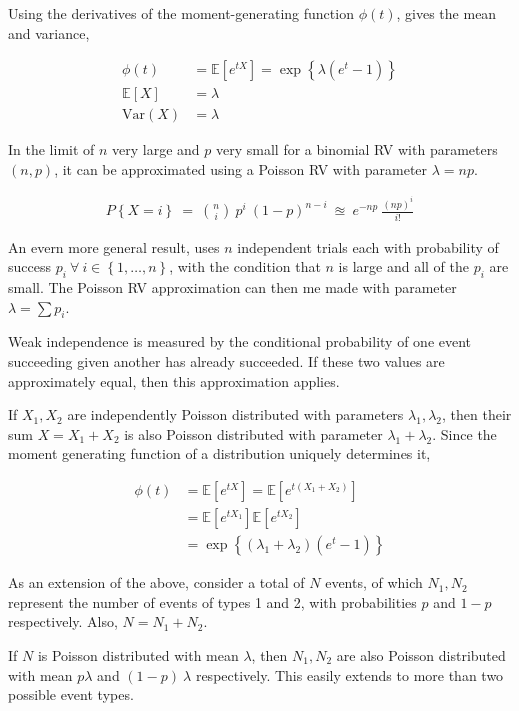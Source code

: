 Using the derivatives of the moment-generating function $ \phi(t) $, gives the mean and variance,

\begin{align}
	\phi(t) &= \mathbb{E}[e^{tX}] = \exp\left\{\lambda (e^t - 1)\right\}\\
	\mathbb{E}[X] &= \lambda \\
	\mathrm{Var}(X) &= \lambda
\end{align}

In the limit of $ n $ very large and $ p $ very small for a binomial RV with parameters $ (n, p) $, it can be approximated using a Poisson RV with parameter $ \lambda = np $.

\begin{align}
	P \left\{X = i\right\}\ =\ \binom{n}{i}\ p^i\ (1-p)^{n-i}\ \approxeq\ e^{-np}\ \frac{(np)^i}{i!}
\end{align}

An evern more general result, uses $ n $ independent trials each with probability of success $ p_i \ \forall\ i \in \left\{1, \dots, n\right\}$, with the condition that $ n $ is large and all of the $ p_i $ are small. The Poisson RV approximation can then me made with parameter $ \lambda = \sum p_i $.

Weak independence is measured by the conditional probability of one event succeeding given another has already succeeded. If these two values are approximately equal, then this approximation applies.

If $ X_1, X_2 $ are independently Poisson distributed with parameters $ \lambda_1, \lambda_2 $, then their sum $ X = X_1 + X_2 $ is also Poisson distributed with parameter $ \lambda_1 + \lambda_2 $. Since the moment generating function of a distribution uniquely determines it,

\begin{align}
	\phi (t) &= \mathbb{E}[e^{tX}] = \mathbb{E}[e^{t(X_1 + X_2)}] \nonumber \\
	&= \mathbb{E}[e^{tX_1}] \mathbb{E}[e^{tX_2}] \nonumber \\
	&= \exp\left\{(\lambda_1 + \lambda_2) (e^t - 1)\right\}
\end{align}

As an extension of the above, consider a total of $ N $ events, of which $ N_1, N_2 $ represent the number of events of types 1 and 2, with probabilities $ p $ and $ 1-p $ respectively. Also, $ N = N_1 + N_2 $.

If $ N $ is Poisson distributed with mean $\lambda$, then $ N_1, N_2 $ are also Poisson distributed with mean $ p\lambda $ and $ (1-p)\ \lambda $ respectively. This easily extends to more than two possible event types.

